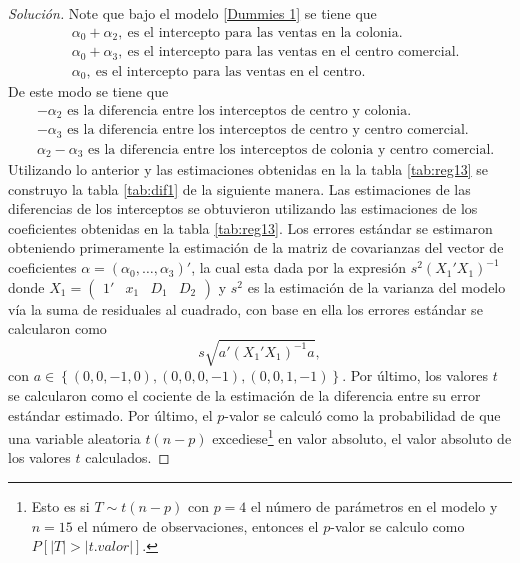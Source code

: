 \documentclass[10.5pt,notitlepage]{article}
\newenvironment{solucion}
  {\begin{proof}[Solución]}
  {\end{proof}}
\newcommand{\abs}[1]{\left\lvert #1 \right\rvert}
\newcommand{\kis}[1]{\left\{ #1 \right\}}
\theoremstyle{plain}
\begin{document}
\begin{solucion}
Note que bajo el modelo \eqref{Dummies 1} se tiene que 
\begin{align*}
    &\alpha_0 + \alpha_2, \ \text{es el intercepto para las ventas en la colonia.} \\
    &\alpha_0 + \alpha_3, \ \text{es el intercepto para las ventas en el centro comercial.}\\ 
    &\alpha_0, \ \text{es el intercepto para las ventas en el centro.} 
\end{align*}
De este modo se tiene que 
\begin{align*}
    &-\alpha_2 \text{ es la diferencia entre los interceptos de centro y colonia}.\\
    &-\alpha_3 \text{ es la diferencia entre los interceptos de centro y centro comercial}.\\
    &\alpha_2 - \alpha_3 \text{ es la diferencia entre los interceptos de colonia y centro comercial}.
\end{align*}
Utilizando lo anterior y las estimaciones obtenidas en la la tabla \ref{tab:reg13} se construyo la tabla \ref{tab:dif1} de la siguiente manera. Las estimaciones de las diferencias de los interceptos se obtuvieron utilizando las estimaciones de los coeficientes obtenidas en la tabla \ref{tab:reg13}. Los errores estándar se estimaron obteniendo primeramente la estimación de la matriz de covarianzas del vector de coeficientes \(\alpha=(\alpha_0,\hdots,\alpha_3)'\), la cual esta dada por la expresión \(s^2(X_1'X_1)^{-1}\) donde \(X_1 = \begin{pmatrix}1' & x_1 & D_1 & D_2\end{pmatrix}\) y \(s^2\) es la estimación de la varianza del modelo vía la suma de residuales al cuadrado, con base en ella los errores estándar se calcularon como 
\begin{equation*}
    s\sqrt{a'(X_1'X_1)^{-1}a},
\end{equation*}
con \(a\in\kis{(0,0,-1,0),(0,0,0,-1),(0,0,1,-1)}\). Por último, los valores \(t\) se calcularon como el cociente de la estimación de la diferencia entre su error estándar estimado. Por último, el \(p\)-valor se calculó como la probabilidad de que una variable aleatoria \(t(n-p)\) excediese\footnote{Esto es si \(T \sim t(n-p)\) con \(p=4\) el número de parámetros en el modelo y \(n=15\) el número de observaciones, entonces el \(p\)-valor se calculo como \(P[\abs{T} > \abs{t.valor}].\)} en valor absoluto, el valor absoluto de los valores \(t\) calculados.
\begin{table}[H]
        \centering
        \resizebox{\columnwidth}{!}{%
}
\end{table}
\end{solucion}
\end{document}

